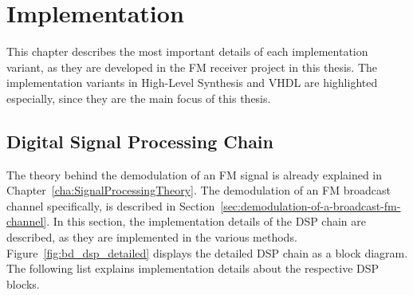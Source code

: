 \chapter{Implementation}
\label{cha:Implementation}

This chapter describes the most important details of each implementation variant, as they are developed in the FM receiver project in this thesis.
The implementation variants in High-Level Synthesis and VHDL are highlighted especially, since they are the main focus of this thesis.

\section{Digital Signal Processing Chain}
\label{sec:impl:dsp-chain}

The theory behind the demodulation of an FM signal is already explained in Chapter~\ref{cha:SignalProcessingTheory}.
The demodulation of an FM broadcast channel specifically, is described in Section~\ref{sec:demodulation-of-a-broadcast-fm-channel}.
In this section, the implementation details of the DSP chain are described, as they are implemented in the various methods.\\

\noindent
Figure~\ref{fig:bd_dsp_detailed} displays the detailed DSP chain as a block diagram.
The following list explains implementation details about the respective DSP blocks.\\



